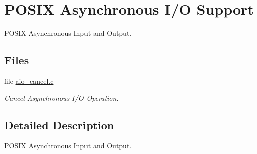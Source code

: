 \hypertarget{group__POSIX__AIO}{}\section{P\+O\+S\+IX Asynchronous I/O Support}
\label{group__POSIX__AIO}


P\+O\+S\+IX Asynchronous Input and Output.  


\subsection*{Files}
\begin{DoxyCompactItemize}
\item 
file \mbox{\hyperlink{aio__cancel_8c}{aio\+\_\+cancel.\+c}}
\begin{DoxyCompactList}\small\item\em Cancel Asynchronous I/O Operation. \end{DoxyCompactList}\end{DoxyCompactItemize}


\subsection{Detailed Description}
P\+O\+S\+IX Asynchronous Input and Output. 

